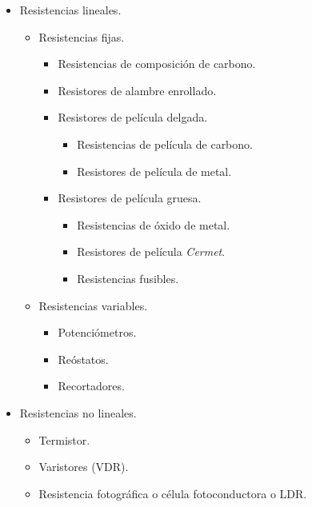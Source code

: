 \documentclass[letter,11pt]{article}
\begin{document}
\begin{enumerate}
\begin{itemize}
    \item Resistencias lineales.
        \begin{itemize}
            \item Resistencias fijas.
                \begin{itemize}
                    \item Resistencias de composición de carbono.
                    \item Resistores de alambre enrollado.
                    \item Resistores de película delgada.
                        \begin{itemize}
                            \item Resistencias de película de carbono.
                            \item Resistores de película de metal.
                        \end{itemize}
                    \item Resistores de película gruesa.
                        \begin{itemize}
                            \item Resistencias de óxido de metal.
                            \item Resistores de película \emph{Cermet}.
                            \item Resistencias fusibles.
                        \end{itemize}
                \end{itemize}
            \item Resistencias variables.
                \begin{itemize}
                    \item Potenciómetros.
                    \item Reóstatos.
                    \item Recortadores.
                \end{itemize}
        \end{itemize}
    \item Resistencias no lineales.
        \begin{itemize}
            \item Termistor.
            \item Varistores (VDR).
            \item Resistencia fotográfica o célula fotoconductora o LDR.
        \end{itemize}
\end{itemize}


\end{enumerate}
\end{document}
